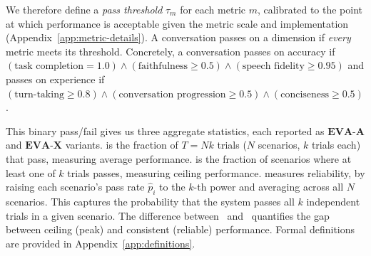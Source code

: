 We therefore define a \textit{pass threshold} $\tau_m$ for each metric $m$, calibrated to the point at which performance is acceptable given the metric scale and implementation (Appendix~\ref{app:metric-details}). A conversation passes on a dimension if \textit{every} metric meets its threshold. Concretely, a conversation passes on accuracy if \((\text{task completion} = 1.0) \wedge (\text{faithfulness} \geq 0.5) \wedge (\text{speech fidelity} \geq 0.95)\) and passes on experience if \((\text{turn-taking} \geq 0.8) \wedge (\text{conversation progression} \geq 0.5) \wedge (\text{conciseness} \geq 0.5)\).

This binary pass/fail gives us three aggregate statistics, each reported as $\textbf{EVA-A}$ and $\textbf{EVA-X}$ variants. \textbf{\passatone} is the fraction of $T = Nk$ trials ($N$ scenarios, $k$ trials each) that pass, measuring average performance. \textbf{\passatk} is the fraction of scenarios where at least one of $k$ trials passes, measuring ceiling performance. \textbf{\passpowerk} measures reliability, by raising each scenario's pass rate $\hat{p}_i$ to the $k$-th power and averaging across all $N$ scenarios. This captures the probability that the system passes all $k$ independent trials in a given scenario. The difference between \passatk~and \passpowerk~quantifies the gap between ceiling (peak) and consistent (reliable) performance. Formal definitions are provided in Appendix~\ref{app:definitions}.
